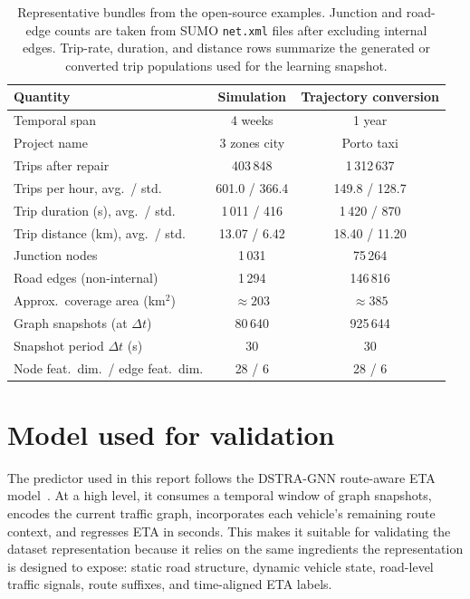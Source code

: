 \begin{table}[!htbp]
\caption[Representative dataset bundles from the open-source examples.]{Representative bundles from the open-source examples. Junction and road-edge counts are taken from SUMO \texttt{net.xml} files after excluding internal edges. Trip-rate, duration, and distance rows summarize the generated or converted trip populations used for the learning snapshot.}
\label{tab:dataset_stats_ch5}
\centering
\scriptsize
\setlength{\tabcolsep}{3pt}
\begin{tabular}{@{}lcc@{}}
\toprule
Quantity & Simulation & Trajectory conversion \\
\midrule
Temporal span & 4 weeks & 1 year \\
Project name & 3 zones city & Porto taxi \\
Trips after repair & 403\,848 & 1\,312\,637 \\
Trips per hour, avg.\ / std. & 601.0 / 366.4 & 149.8 / 128.7 \\
Trip duration (s), avg.\ / std. & 1\,011 / 416 & 1\,420 / 870 \\
Trip distance (km), avg.\ / std. & 13.07 / 6.42 & 18.40 / 11.20 \\
Junction nodes & 1\,031 & 75\,264 \\
Road edges (non-internal) & 1\,294 & 146\,816 \\
Approx.\ coverage area (km$^2$) & $\approx 203$ & $\approx 385$ \\
Graph snapshots (at $\Delta t$) & 80\,640 & 925\,644 \\
Snapshot period $\Delta t$ (s) & 30 & 30 \\
Node feat.\ dim.\ / edge feat.\ dim. & 28 / 6 & 28 / 6 \\
\bottomrule
\end{tabular}
\end{table}

\section{Model used for validation}
The predictor used in this report follows the DSTRA-GNN route-aware ETA model~\cite{dstra_gnn}. At a high level, it consumes a temporal window of graph snapshots, encodes the current traffic graph, incorporates each vehicle's remaining route context, and regresses ETA in seconds. This makes it suitable for validating the dataset representation because it relies on the same ingredients the representation is designed to expose: static road structure, dynamic vehicle state, road-level traffic signals, route suffixes, and time-aligned ETA labels.

